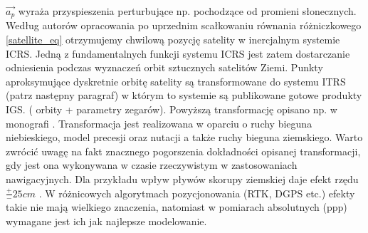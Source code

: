 $\vec{a_p}$ wyraża przyspieszenia perturbujące np. pochodzące od promieni słonecznych.
Według autorów opracowania \cite[]{BRZEZINSKI_2012} po uprzednim scałkowaniu równania różniczkowego \ref{satellite_eq}
otrzymujemy chwilową pozycję satelity w inercjalnym systemie ICRS. Jedną z fundamentalnych funkcji systemu ICRS 
jest zatem dostarczanie odniesienia podczas wyznaczeń orbit sztucznych satelitów Ziemi. Punkty aproksymujące dyskretnie orbitę satelity 
są transformowane do systemu ITRS (patrz następny paragraf) w którym to systemie są publikowane gotowe produkty IGS. ( orbity + parametry zegarów).
Powyższą transformację opisano np. w monografi \cite[][strona 43]{IERS_2010}. Transformacja jest realizowana w oparciu o ruchy bieguna niebieskiego,
model precesji oraz nutacji a także ruchy bieguna ziemskiego. Warto zwrócić uwagę na fakt znacznego pogorszenia dokładności opisanej transformacji,
gdy jest ona wykonywana w czasie rzeczywistym w zastosowaniach nawigacyjnych. Dla przykładu wpływ pływów skorupy ziemskiej daje efekt rzędu 
$\frac{+}{-}25 cm$ \cite[][strona 166]{BRZEZINSKI_2012}. W różnicowych algorytmach pozycjonowania (RTK, DGPS etc.) 
efekty takie nie mają wielkiego znaczenia, natomiast w pomiarach absolutnych (ppp) wymagane jest ich jak najlepsze modelowanie.
